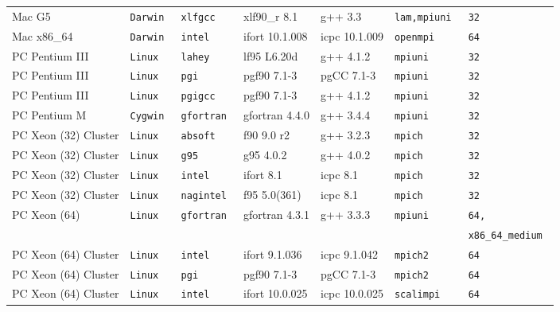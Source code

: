\begin{tabular}{lllllll}
Mac G5          &\tt Darwin &\tt xlfgcc  & xlf90\_r \footnotesize 8.1& g++ \footnotesize 3.3    &\tt lam,mpiuni &\tt 32 \\
Mac x86\_64      &\tt Darwin &\tt intel   & ifort \footnotesize 10.1.008 & icpc \footnotesize 10.1.009 &\tt openmpi &\tt 64 \\
PC Pentium III  &\tt Linux  &\tt lahey   & lf95 \footnotesize L6.20d & g++ \footnotesize 4.1.2  &\tt mpiuni     &\tt 32 \\
PC Pentium III  &\tt Linux  &\tt pgi     & pgf90 \footnotesize 7.1-3 & pgCC \footnotesize 7.1-3 &\tt mpiuni     &\tt 32 \\
PC Pentium III  &\tt Linux  &\tt pgigcc  & pgf90 \footnotesize 7.1-3 & g++ \footnotesize 4.1.2  &\tt mpiuni     &\tt 32 \\
PC Pentium M    &\tt Cygwin &\tt gfortran& gfortran \footnotesize 4.4.0& g++  \footnotesize 3.4.4  &\tt mpiuni  &\tt 32 \\
PC Xeon (32) Cluster &\tt Linux  &\tt absoft & f90 \footnotesize 9.0 r2 & g++ \footnotesize 3.2.3 &\tt mpich      &\tt 32 \\
PC Xeon (32) Cluster &\tt Linux  &\tt g95         & g95 \footnotesize 4.0.2     & g++  \footnotesize 4.0.2    &\tt mpich     &\tt 32 \\
PC Xeon (32) Cluster &\tt Linux  &\tt intel       & ifort \footnotesize 8.1     & icpc \footnotesize 8.1      &\tt mpich     &\tt 32 \\
PC Xeon (32) Cluster &\tt Linux  &\tt nagintel    & f95 \footnotesize 5.0(361)  & icpc \footnotesize 8.1      &\tt mpich     &\tt 32 \\
PC Xeon (64)         &\tt Linux  &\tt gfortran    & gfortran \footnotesize 4.3.1& g++  \footnotesize 3.3.3  &\tt mpiuni &\tt 64, \\
                     &           &                &                             &                           &           &\tt x86\_64\_medium \\
PC Xeon (64) Cluster &\tt Linux  &\tt intel  & ifort \footnotesize 9.1.036  & icpc \footnotesize 9.1.042  &\tt mpich2    &\tt 64 \\
PC Xeon (64) Cluster &\tt Linux  &\tt pgi    & pgf90 \footnotesize 7.1-3    & pgCC \footnotesize 7.1-3    &\tt mpich2    &\tt 64 \\
PC Xeon (64) Cluster &\tt Linux  &\tt intel  & ifort \footnotesize 10.0.025 & icpc \footnotesize 10.0.025 &\tt scalimpi  &\tt 64 \\

\end{tabular}
